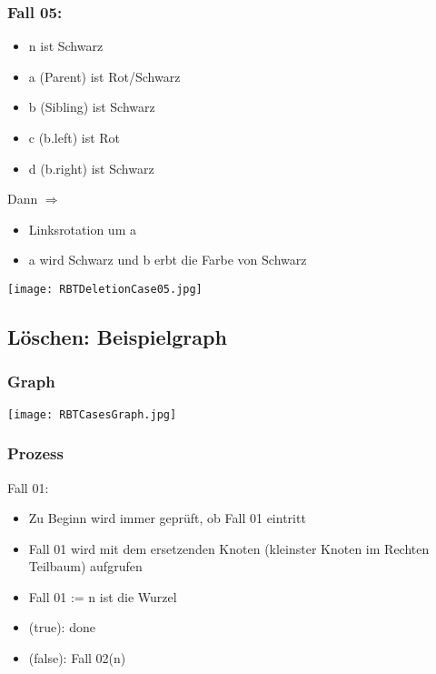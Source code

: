 		\centerline{\noindent\makebox[0.5\linewidth]{\rule{0.5\paperwidth}{0.4pt}}}
		\subsubsection{Fall 05:}
			\begin{minipage}[t]{0.5\textwidth}
				\begin{itemize}
					\item n ist Schwarz
					\item a (Parent) ist Rot/Schwarz
					\item b (Sibling) ist Schwarz
					\item c (b.left) ist Rot
					\item d (b.right) ist Schwarz
				\end{itemize}

				Dann $\Rightarrow$
				\begin{itemize}
					\item Linksrotation um a
					\item a wird Schwarz und b erbt die Farbe von Schwarz
				\end{itemize}
			\end{minipage}
			\begin{minipage}[t]{0.45\textwidth}
				\begin{center}
					\texttt{[image: RBTDeletionCase05.jpg]}	
				\end{center}
			\end{minipage}
				

	\subsection{Löschen: Beispielgraph}
		\subsubsection{Graph}
			\begin{center}
				\texttt{[image: RBTCasesGraph.jpg]}
			\end{center}

		\subsubsection{Prozess}
			Fall 01:
			\begin{itemize}
				\item Zu Beginn wird immer geprüft, ob Fall 01 eintritt
				\item Fall 01 wird mit dem ersetzenden Knoten (kleinster Knoten im Rechten Teilbaum) aufgrufen
				\item Fall 01 := n ist die Wurzel
				\item (true): done
				\item (false): Fall 02(n) \\
			\end{itemize}
			 

